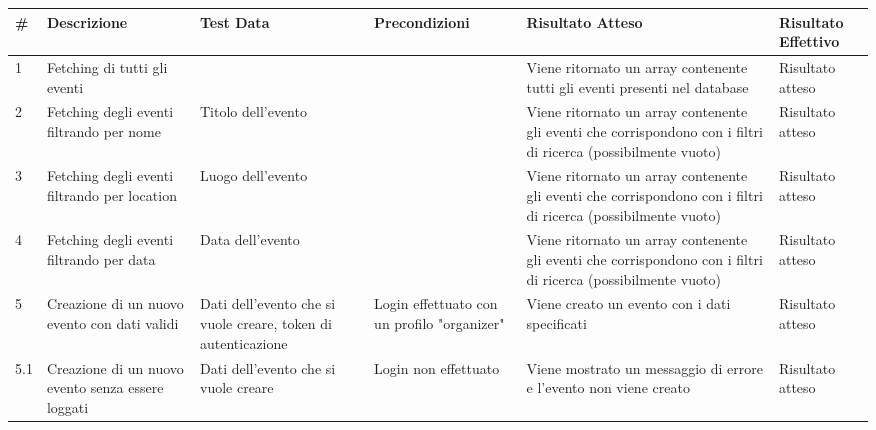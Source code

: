 \documentclass[9pt]{extarticle}
\begin{document}
\begin{table}[!htb]
	\centering
	\renewcommand{\arraystretch}{1.7} %
	\setlength{\tabcolsep}{6pt} %
	\resizebox{\textwidth}{!}
	{%
	\begin{tabular}{p{.5cm} p{3.5cm} p{2.5cm} p{2.5cm} p{5cm} p{1.5cm}}
		\toprule
		\rowcolor{gray!20}
		\# & Descrizione & Test Data & Precondizioni & Risultato Atteso & Risultato Effettivo \\ \midrule
		1 & Fetching di tutti gli eventi                                                 &                                                               &                                             & Viene ritornato un array contenente tutti gli eventi presenti nel database                                     & Risultato atteso      \\\midrule
		2 & Fetching degli eventi filtrando per nome                                     & Titolo dell'evento                                            &                                             & Viene ritornato un array contenente gli eventi che corrispondono con i filtri di ricerca (possibilmente vuoto) & Risultato atteso      \\\midrule
		3 & Fetching degli eventi filtrando per location                                 & Luogo dell'evento                                             &                                             & Viene ritornato un array contenente gli eventi che corrispondono con i filtri di ricerca (possibilmente vuoto) & Risultato atteso      \\\midrule
		4 & Fetching degli eventi filtrando per data                                     & Data dell'evento                                              &                                             & Viene ritornato un array contenente gli eventi che corrispondono con i filtri di ricerca (possibilmente vuoto) & Risultato atteso      \\\midrule
		5 & Creazione di un nuovo evento con dati validi                                 & Dati dell'evento che si vuole creare, token di autenticazione & Login effettuato con un profilo "organizer" & Viene creato un evento con i dati specificati                                                                  & Risultato atteso      \\\midrule
		5.1 & Creazione di un nuovo evento senza essere loggati                            & Dati dell'evento che si vuole creare                          & Login non effettuato                        & Viene mostrato un messaggio di errore e l'evento non viene creato                                              & Risultato atteso      \\\midrule

\end{tabular}}
\end{table}
\end{document}
